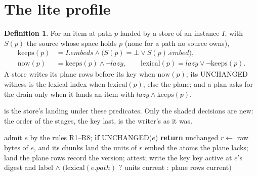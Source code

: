 \documentclass[11pt]{article}
\theoremstyle{plain}
\theoremstyle{definition}
\newtheorem{definition}{Definition}
\theoremstyle{remark}
\begin{document}
\section{The lite profile}\label{sec:profile}

\begin{definition}
For an item at path $p$ landed by a store of an instance $I$, with $S(p)$ the source whose space
holds $p$ (none for a path no source owns),
\begin{align*}
  \mathrm{keeps}(p) &= I.\mathit{embeds} \wedge \big(S(p)=\bot \vee S(p).\mathit{embed}\big),\\
  \mathrm{now}(p) &= \mathrm{keeps}(p) \wedge \neg\mathit{lazy}, \qquad
  \mathrm{lexical}(p) = \mathit{lazy} \vee \neg\mathrm{keeps}(p).
\end{align*}
A store writes its plane rows before its key when $\mathrm{now}(p)$; its UNCHANGED witness is the
lexical index when $\mathrm{lexical}(p)$, else the plane; and a plan asks for the drain only when it
lands an item with $\mathit{lazy}\wedge\mathrm{keeps}(p)$.
\end{definition}

 is the store's landing under these predicates. Only the shaded decisions are new:
the order of the stages, the key last, is the writer's as it was.

\begin{algorithm}[t]
\caption{A store's landing}\label{alg:store}
\begin{algorithmic}[1]
  \State admit $e$ by the rules R1--R8; \textbf{if} UNCHANGED($e$) \textbf{return} unchanged
  \State $r \gets$ raw bytes of $e$, and its chunks
   land the units of $r$ \EndIf
   embed the atoms the plane lacks; land the plane rows \EndIf
  \State record the version; attest; write the key 
\EndProcedure
{}
  \State \Return key active at $e$'s digest and label $\wedge$
    $\big(\mathrm{lexical}(e.\mathit{path})$ ? units current : plane rows current$\big)$
\EndFunction
\end{algorithmic}
\end{algorithm}
\end{document}

